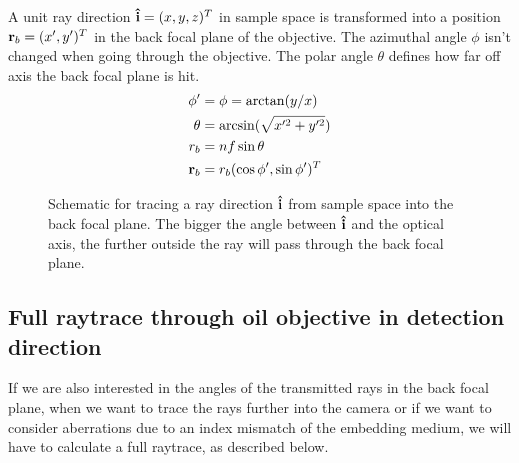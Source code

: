 A unit ray direction $\mathbf{\hat{i}}=(x,y,z)^T$ in sample space is transformed
into a position $\mathbf{r}_b=(x',y')^T$ in the back focal plane of the
objective. The azimuthal angle $\phi$ isn't changed when going through
the objective. The polar angle $\theta$ defines how far off axis the
back focal plane is hit.
\begin{align}
  \phi'&=\phi=\arctan(y/x)\\
  \theta&=\arcsin(\sqrt{x'^2+y'^2})\\
  r_b&=nf\sin\theta\\
  \mathbf{r}_b&=r_b(\cos\phi',\sin\phi')^T
\end{align}
 \begin{figure}[!hbt]
   \centering
   
   \caption{Schematic for tracing a ray direction $\mathbf{\hat{i}}$ from sample
     space into the back focal plane. The bigger the angle between
     $\mathbf{\hat{i}}$ and the optical axis, the further outside the ray will pass
     through the back focal plane.}
 \end{figure}
 \subsection{Full raytrace through oil objective in detection
   direction}
\label{sec:objective-raytrace-detection}
If we are also interested in the angles of the transmitted rays in the
back focal plane, when we want to trace the rays further into the
camera or if we want to consider aberrations due to an index mismatch
of the embedding medium, we will have to calculate a full raytrace, as
described below.

